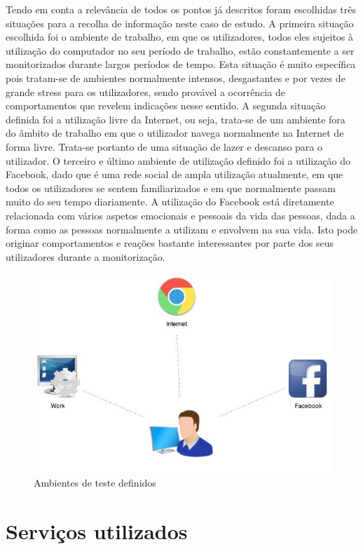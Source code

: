 Tendo em conta a relevância de todos os pontos já descritos foram escolhidas três situações para a recolha de informação neste caso de estudo. A primeira situação escolhida foi o ambiente de trabalho, em que os utilizadores, todos eles sujeitos à utilização do computador no seu período de trabalho, estão constantemente a ser monitorizados durante largos períodos de tempo. Esta situação é muito específica pois tratam-se de ambientes normalmente intensos, desgastantes e por vezes de grande stress para os utilizadores, sendo provável a ocorrência de comportamentos que revelem indicações nesse sentido. A segunda situação definida foi a utilização livre da Internet, ou seja, trata-se de um ambiente fora do âmbito de trabalho em que o utilizador navega normalmente na Internet de forma livre. Trata-se portanto de uma situação de lazer e descanso para o utilizador. O terceiro e último ambiente de utilização definido foi a utilização do Facebook, dado que é uma rede social de ampla utilização atualmente, em que todos os utilizadores se sentem familiarizados e em que normalmente passam muito do seu tempo diariamente. A utilização do Facebook está diretamente relacionada com vários aspetos emocionais e pessoais da vida das pessoas, dada a forma como as pessoas normalmente a utilizam e envolvem na sua vida. Isto pode originar comportamentos e reações bastante interessantes por parte dos seus utilizadores durante a monitorização.

\begin{figure}[htb]
   \centering
   \includegraphics[scale=0.5]{Images/ambientesestudo.jpg}
   \caption{Ambientes de teste definidos}
\end{figure}

\section{Serviços utilizados}

